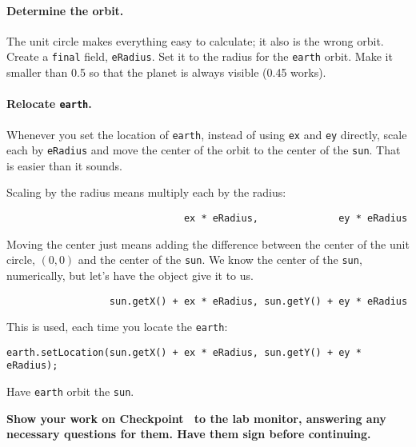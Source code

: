 \documentclass[12pt,twoside]{memoir}
\newenvironment{Checkpoint}[1]{%
\begin{Exercise}[name={Checkpoint},title={#1}]}{%
\end{Exercise}%
\textbf{Show your work on Checkpoint~\theExercise{} to the lab monitor, %
  answering any necessary questions for them.  Have them sign before continuing.}}
\begin{document}
\begin{Checkpoint}{Earth should orbit the sun.}
\paragraph{Determine the orbit.}
The unit circle makes everything easy to calculate; it also is the
wrong orbit. Create a \texttt{final} field, \texttt{eRadius}. Set it
to the radius for the \texttt{earth} orbit. Make it smaller than 0.5
so that the planet is always visible (0.45 works). 

\paragraph{Relocate \texttt{earth}.}
Whenever you set the location of \texttt{earth}, instead of using
\texttt{ex} and \texttt{ey} directly, scale each by \texttt{eRadius}
and move the center of the orbit to the center of the
\texttt{sun}. That is easier than it sounds.

Scaling by the radius means multiply each by the radius:

\begin{lstlisting}
                               ex * eRadius,              ey * eRadius  
\end{lstlisting}

Moving the center just means adding the difference between the center
of the unit circle, $(0, 0)$ and the center of the \texttt{sun}. We
know the center of the \texttt{sun}, numerically, but let's have the
object give it to us.

\begin{lstlisting}
                  sun.getX() + ex * eRadius, sun.getY() + ey * eRadius
\end{lstlisting}

This is used, each time you locate the \texttt{earth}:

\begin{lstlisting}
earth.setLocation(sun.getX() + ex * eRadius, sun.getY() + ey * eRadius);
\end{lstlisting}

Have \texttt{earth} orbit the \texttt{sun}.
\end{Checkpoint}
\end{document}
